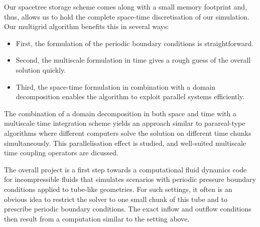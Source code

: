 \documentclass{report}
\begin{document}
Our spacetree storage scheme comes along with a small memory
footprint and, thus, allows us to hold the complete space-time discretisation of
our simulation.
Our multigrid algorithm benefits this in
several ways:
\begin{itemize}
\item First, the formulation of the periodic boundary conditions is
straightforward.
\item Second, the multiscale formulation in time gives a rough guess of the
overall solution quickly.
\item Third, the space-time formulation in combination with a domain
decomposition enables the algorithm to exploit parallel systems
efficiently.
\end{itemize}
The combination of a domain decomposition in both space and time with a
multiscale time integration scheme yields an approach similar to
parareal-type algorithms where different computers solve the solution on
different time chunks simultaneously.
This parallelisation effect is studied, and well-suited multiscale time coupling
operators are dicussed.

The overall project is a first step towards a computational fluid dynamics code
for incompressible fluids that simulates scenarios with periodic
pressure boundary conditions applied to tube-like geometries.
For such settings, it often is an obvious idea to restrict the solver to one
small chunk of this tube and to prescribe periodic boundary conditions.
The exact inflow and outflow conditions then result from a computation similar
to the setting above.
\end{document}
